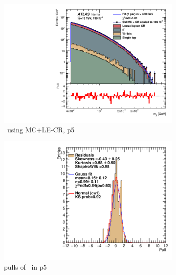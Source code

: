\begin{figure}[H]
\begin{subfigure}[h]{0.38\linewidth}
    \includegraphics[scale=0.3]{figs/ch6/fit/variable_nosmooth/p5/10PB/output_SMMCplusCR_Mjj_p5.pdf}%
     \caption{\mjj \ using MC+LE-CR, p5}
     \end{subfigure}
     \hfill
    \begin{subfigure}[h]{0.4\linewidth}
    \includegraphics[scale=0.32]{figs/ch6/fit/variable_nosmooth/p5/10PB/pull_SMMCplusCR_Mjj_p5.pdf}%
    \caption{pulls of \mjj \ in p5}
    \end{subfigure}
    \hfill
    \begin{subfigure}[h]{0.38\linewidth}

\end{subfigure}
\end{figure}
